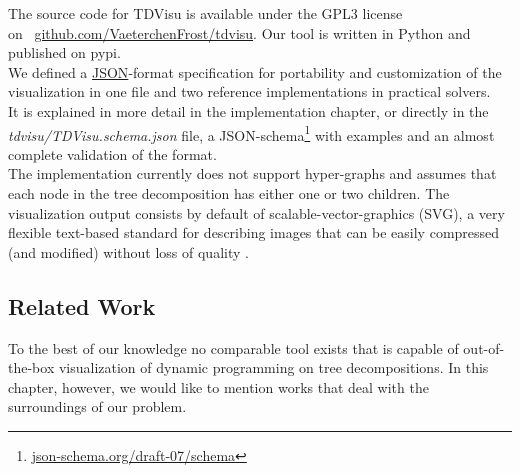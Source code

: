 \documentclass[a4paper, 12pt, bibliography=totoc]{scrartcl}
\begin{document}
The source code for TDVisu is available under the GPL3 license \\on
\mbox{ \url{github.com/VaeterchenFrost/tdvisu}}. Our tool is written in Python and published on pypi.\\

We defined a \href{www.json.org/json-en.html}{JSON}-format specification for portability and customization of the visualization in one file and two reference implementations in practical solvers.\\
It is explained in more detail in the implementation chapter, or directly in the \textit{tdvisu/TDVisu.schema.json} file, a JSON-schema\footnote{\url{json-schema.org/draft-07/schema}} with examples and an almost complete validation of the format.\\

The implementation currently does not support hyper-graphs and assumes that each node in the tree decomposition has either one or two children.
The visualization output consists by default of scalable-vector-graphics (SVG), a very flexible text-based standard for describing images that can be easily compressed (and modified) without loss of quality \cite{SVGMozilla}.



\subsection{Related Work}

To the best of our knowledge no comparable tool exists that is capable of out-of-the-box visualization of dynamic programming on tree decompositions.
In this chapter, however, we would like to mention works that deal with the surroundings of our problem.
\end{document}
